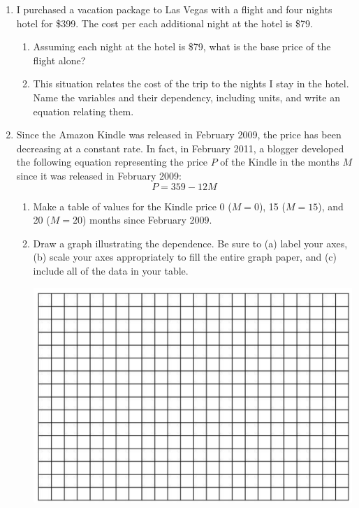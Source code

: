 \documentclass[12pt]{article}
\begin{document}
\begin{enumerate}
\item I purchased a vacation package to Las Vegas with a flight and four nights hotel for \$399.  The cost per each additional night at the hotel is \$79.  

\begin{enumerate}
\item Assuming each night at the hotel is \$79, what is the base price of the flight alone?
\vfill

\item This situation relates the cost of the trip to the nights I stay in the hotel. Name the variables and their dependency, including units, and write an equation relating them.
\vfill
\vfill
\end{enumerate}
\newpage %
\item Since the Amazon Kindle was released in February 2009, the price has been decreasing at a constant rate.  In fact, in February 2011, a blogger developed the following equation representing the price $P$ of the Kindle in the months $M$ since it was released in February 2009: $$ P = 359 - 12 M $$

\begin{enumerate}
\item Make a table of values for the Kindle price 0 ($M=0$), 15 ($M=15$), and 20 ($M=20$) months since February 2009.
\vfill
\item Draw a graph illustrating the dependence.  Be sure to (a) label your axes, (b) scale your axes appropriately to fill the entire graph paper, and (c) include all of the data in your table.

\begin{center}
 {\includegraphics [width = 6in] {../graphPaper}}
\end{center}
\vspace{.1in}


\end{enumerate}
\end{enumerate}
\end{document}
